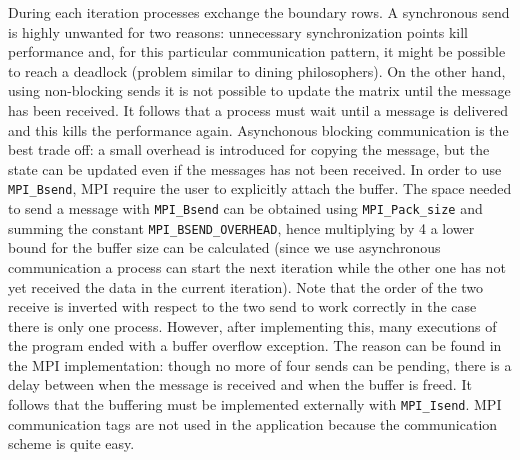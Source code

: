 \documentclass{article}
\begin{document}
During each iteration processes exchange the boundary rows. A synchronous send is highly unwanted for two reasons: unnecessary synchronization points kill performance and, for this particular communication pattern, it might be possible to reach a deadlock (problem similar to dining philosophers). On the other hand, using non-blocking sends it is not possible to update the matrix until the message has been received. It follows that a process must wait until a message is delivered and this kills the performance again. Asynchonous blocking communication is the best trade off: a small overhead is introduced for copying the message, but the state can be updated even if the messages has not been received. In order to use \texttt{MPI\_Bsend}, MPI require the user to explicitly attach the buffer. The space needed to send a message with \texttt{MPI\_Bsend} can be obtained using \texttt{MPI\_Pack\_size} and summing the constant \texttt{MPI\_BSEND\_OVERHEAD}, hence multiplying by 4 a lower bound for the buffer size can be calculated (since we use asynchronous communication a process can start the next iteration while the other one has not yet received the data in the current iteration). Note that the order of the two receive is inverted with respect to the two send to work correctly in the case there is only one process. However, after implementing this, many executions of the program ended with a buffer overflow exception. The reason can be found in the MPI implementation: though no more of four sends can be pending, there is a delay between when the message is received and when the buffer is freed. It follows that the buffering must be implemented externally with \texttt{MPI\_Isend}.
MPI communication tags are not used in the application because the communication scheme is quite easy.
\end{document}
